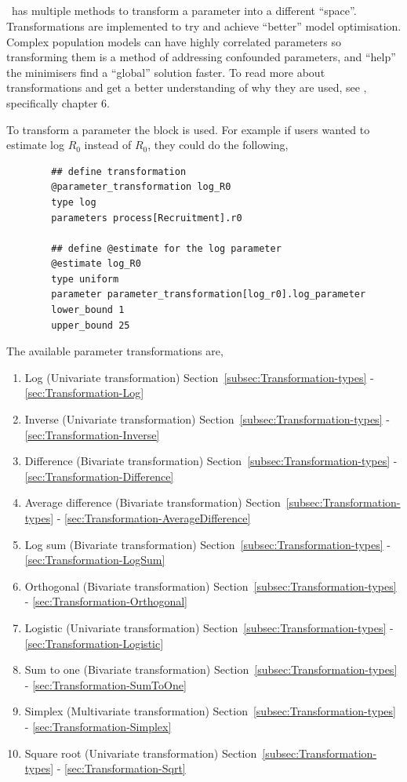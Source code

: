 \subsection{\label{sec:Transformation}}
\CNAME\ has multiple methods to transform a parameter into a different \enquote{space}. Transformations are implemented to try and achieve \enquote{better} model optimisation. Complex population models can have highly correlated parameters so transforming them is a method of addressing confounded parameters, and \enquote{help} the minimisers find a \enquote{global} solution faster. To read more about transformations and get a better understanding of why they are used, see \cite{gilks1995markov}, specifically chapter 6.


To transform a parameter the  block is used. For example if users wanted to estimate log \(R_0\) instead of \(R_0\), they could do the following,
{\small{\begin{verbatim}
		## define transformation
		@parameter_transformation log_R0
		type log
		parameters process[Recruitment].r0

		## define @estimate for the log parameter
		@estimate log_R0
		type uniform
		parameter parameter_transformation[log_r0].log_parameter
		lower_bound 1
		upper_bound 25
\end{verbatim}}}
%
The available parameter transformations are,
\begin{enumerate}
	\item Log (Univariate transformation) Section~\ref{subsec:Transformation-types} - \ref{sec:Transformation-Log}
	\item Inverse (Univariate transformation) Section~\ref{subsec:Transformation-types} - \ref{sec:Transformation-Inverse}
	\item Difference (Bivariate transformation) Section~\ref{subsec:Transformation-types} - \ref{sec:Transformation-Difference}
	\item Average difference (Bivariate transformation) Section~\ref{subsec:Transformation-types} - \ref{sec:Transformation-AverageDifference}
	\item Log sum (Bivariate transformation) Section~\ref{subsec:Transformation-types} - \ref{sec:Transformation-LogSum}	
	\item Orthogonal (Bivariate transformation) Section~\ref{subsec:Transformation-types} - \ref{sec:Transformation-Orthogonal}
	\item Logistic (Univariate transformation) Section~\ref{subsec:Transformation-types} - \ref{sec:Transformation-Logistic}
	\item Sum to one (Bivariate transformation) Section~\ref{subsec:Transformation-types} - \ref{sec:Transformation-SumToOne}
	\item Simplex (Multivariate transformation) Section~\ref{subsec:Transformation-types} - \ref{sec:Transformation-Simplex}	
	\item Square root (Univariate transformation) Section~\ref{subsec:Transformation-types} - \ref{sec:Transformation-Sqrt}	
\end{enumerate}

